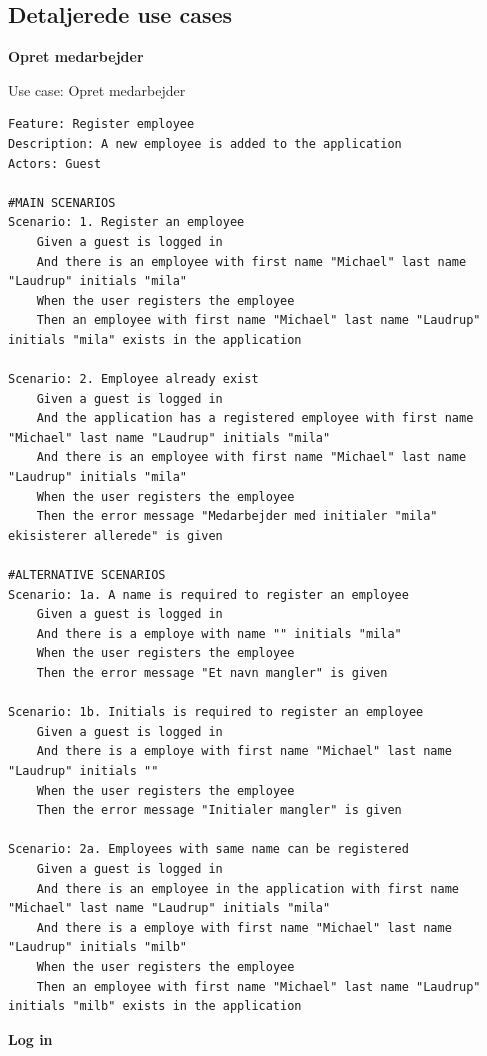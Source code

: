 \subsection{Detaljerede use cases}
\textbf{Opret medarbejder}
\begin{listing}[H]
    \centering
    \caption{Use case: Opret medarbejder}\label{lst:usecase_register_employee}
    \begin{verbatim}  
Feature: Register employee
Description: A new employee is added to the application
Actors: Guest

#MAIN SCENARIOS
Scenario: 1. Register an employee
    Given a guest is logged in
    And there is an employee with first name "Michael" last name "Laudrup" initials "mila"  
    When the user registers the employee
    Then an employee with first name "Michael" last name "Laudrup" initials "mila" exists in the application

Scenario: 2. Employee already exist
    Given a guest is logged in
    And the application has a registered employee with first name "Michael" last name "Laudrup" initials "mila"
    And there is an employee with first name "Michael" last name "Laudrup" initials "mila"
    When the user registers the employee
    Then the error message "Medarbejder med initialer "mila" ekisisterer allerede" is given

#ALTERNATIVE SCENARIOS
Scenario: 1a. A name is required to register an employee
    Given a guest is logged in
    And there is a employe with name "" initials "mila"  
    When the user registers the employee
    Then the error message "Et navn mangler" is given

Scenario: 1b. Initials is required to register an employee
    Given a guest is logged in
    And there is a employe with first name "Michael" last name "Laudrup" initials ""
    When the user registers the employee
    Then the error message "Initialer mangler" is given

Scenario: 2a. Employees with same name can be registered
    Given a guest is logged in
    And there is an employee in the application with first name "Michael" last name "Laudrup" initials "mila"
    And there is a employe with first name "Michael" last name "Laudrup" initials "milb"  
    When the user registers the employee
    Then an employee with first name "Michael" last name "Laudrup" initials "milb" exists in the application
    \end{verbatim}
\end{listing}\newpage
\textbf{Log in}
